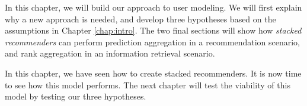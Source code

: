 \label{chap:methods}

In this chapter, we will build our approach to user modeling.
We will first explain why a new approach is needed,
and develop three hypotheses based on the 
assumptions in Chapter \ref{chap:intro}.
The two final sections will show how \emph{stacked recommenders}
can perform prediction aggregation in a recommendation scenario,
and rank aggregation in an information retrieval scenario.







\hr

In this chapter, we have seen how to create stacked recommenders.
It is now time to see how this model performs.
The next chapter will test the viability of this model
by testing our three hypotheses.
